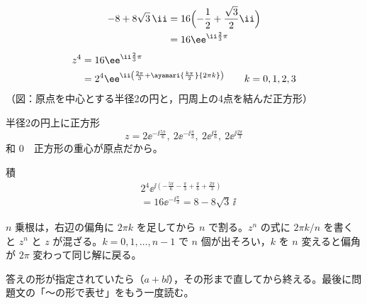 \begin{align*}
-8+8\sqrt{3}\,\ii&=16\Bigl(-\frac{1}{2}+\frac{\sqrt{3}}{2}\ii\Bigr)\\
&=16\ee^{\ii\frac{2}{3}\pi}
\end{align*}
\begin{align*}
z^{4}&=16\ee^{\ii\frac{2}{3}\pi}\\
&=2^{4}\ee^{\ii\left(\frac{2\pi}{3}+\ayamari{\frac{k\pi}{2}}{2\pi k}\right)}\qquad k=0,1,2,3
\end{align*}
（図：原点を中心とする半径2の円と，円周上の4点を結んだ正方形）

半径2の円上に正方形
\[ z=2\ee^{-\ii\frac{5\pi}{6}},\ 2\ee^{-\ii\frac{\pi}{3}},\ 2\ee^{\ii\frac{\pi}{6}},\ 2\ee^{\ii\frac{2\pi}{3}} \]
和 $0$　正方形の重心が原点だから。

積
\begin{align*}
&2^{4}\ee^{\ii\left(-\frac{5\pi}{6}-\frac{\pi}{3}+\frac{\pi}{6}+\frac{2\pi}{3}\right)}\\
&=16\ee^{-\ii\frac{\pi}{3}}=8-8\sqrt{3}\,\ii
\end{align*}
\item $n$ 乗根は，右辺の偏角に $2\pi k$ を足してから $n$ で割る。$z^{n}$ の式に $2\pi k/n$ を書くと $z^{n}$ と $z$ が混ざる。$k=0,1,\ldots,n-1$ で $n$ 個が出そろい，$k$ を $n$ 変えると偏角が $2\pi$ 変わって同じ解に戻る。
\item 答えの形が指定されていたら（$a+b\ii$），その形まで直してから終える。最後に問題文の「〜の形で表せ」をもう一度読む。
